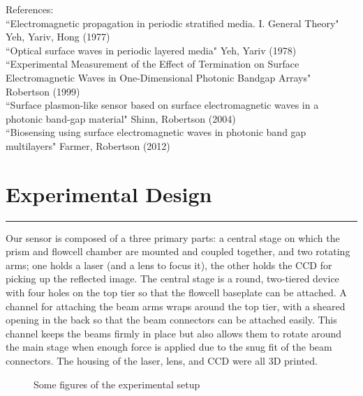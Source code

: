 \documentclass{report}
\begin{document}
\begin{flushleft}
{	References:\\
	``Electromagnetic propagation in periodic stratified media. I. General Theory" Yeh, Yariv, Hong (1977)\\
	``Optical surface waves in periodic layered media" Yeh, Yariv (1978)\\
	``Experimental Measurement of the Effect of Termination on Surface Electromagnetic Waves in One-Dimensional Photonic Bandgap Arrays" Robertson (1999)\\
	``Surface plasmon-like sensor based on surface electromagnetic waves in a photonic band-gap material" Shinn, Robertson (2004)\\
	``Biosensing using surface electromagnetic waves in photonic band gap multilayers" Farmer, Robertson (2012)\\
	}
	\section*{Experimental Design}
	\vspace{-0.1cm}\hrule\vspace{0.2cm}
	\par{Our sensor is composed of a three primary parts: a central stage on which the prism and flowcell chamber are mounted and coupled together, and two rotating arms; one holds a laser (and a lens to focus it), the other holds the CCD for picking up the reflected image. The central stage is a round, two-tiered device with four holes on the top tier so that the flowcell baseplate can be attached. A channel for attaching the beam arms wraps around the top tier, with a sheared opening in the back so that the beam connectors can be attached easily. This channel keeps the beams firmly in place but also allows them to rotate around the main stage when enough force is applied due to the snug fit of the beam connectors. The housing of the laser, lens, and CCD were all 3D printed.\\}
	\vspace{0.5cm}
	\begin{figure}[h]
		\centering
		Some figures of the experimental setup

\end{figure}
\end{flushleft}
\end{document}
